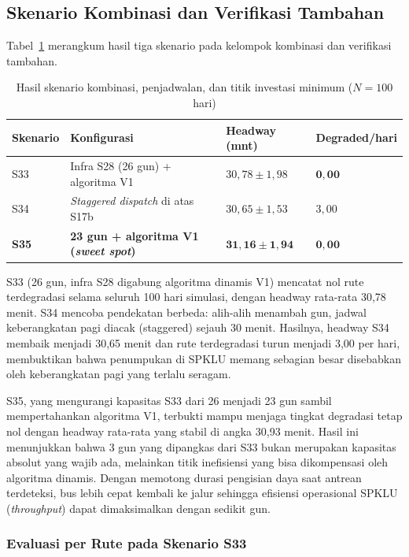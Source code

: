 \subsection{Skenario Kombinasi dan Verifikasi Tambahan}

Tabel~\ref{tab:eval-s33-s35} merangkum hasil tiga skenario pada kelompok
kombinasi dan verifikasi tambahan.

\begin{table}[h]
	\centering
	\caption{Hasil skenario kombinasi, penjadwalan, dan titik investasi minimum ($N=100$ hari)}
	\label{tab:eval-s33-s35}
	\begin{tabularx}{\linewidth}{|l|X|l|l|}
		\hline
		\textbf{Skenario} & \textbf{Konfigurasi} & \textbf{Headway (mnt)} & \textbf{Degraded/hari} \\
		\hline
		S33 & Infra S28 (26 gun) + algoritma V1 & $30{,}78 \pm 1{,}98$ & $\mathbf{0{,}00}$ \\
		\hline
		S34 & \textit{Staggered dispatch} di atas S17b & $30{,}65 \pm 1{,}53$ & $3{,}00$ \\
		\hline
		\textbf{S35} & \textbf{23 gun + algoritma V1 (\textit{sweet spot})} & $\mathbf{31{,}16 \pm 1{,}94}$ & $\mathbf{0{,}00}$ \\
		\hline
	\end{tabularx}
\end{table}

S33 (26 gun, infra S28 digabung algoritma dinamis V1) mencatat nol rute
terdegradasi selama seluruh 100 hari simulasi, dengan headway rata-rata
30,78 menit. S34 mencoba pendekatan berbeda: alih-alih menambah gun,
jadwal keberangkatan pagi diacak (staggered) sejauh 30 menit. Hasilnya,
headway S34 membaik menjadi 30,65 menit dan rute terdegradasi turun
menjadi 3,00 per hari, membuktikan bahwa penumpukan di SPKLU memang
sebagian besar disebabkan oleh keberangkatan pagi yang terlalu seragam.

S35, yang mengurangi kapasitas S33 dari 26 menjadi 23 gun sambil
mempertahankan algoritma V1, terbukti mampu menjaga tingkat degradasi
tetap nol dengan headway rata-rata yang stabil di angka 30,93 menit.
Hasil ini menunjukkan bahwa 3 gun yang dipangkas dari S33 bukan merupakan
kapasitas absolut yang wajib ada, melainkan titik inefisiensi yang bisa
dikompensasi oleh algoritma dinamis. Dengan memotong durasi pengisian daya
saat antrean terdeteksi, bus lebih cepat kembali ke jalur sehingga
efisiensi operasional SPKLU (\textit{throughput}) dapat dimaksimalkan dengan
sedikit gun.

\subsubsection{Evaluasi per Rute pada Skenario S33}

